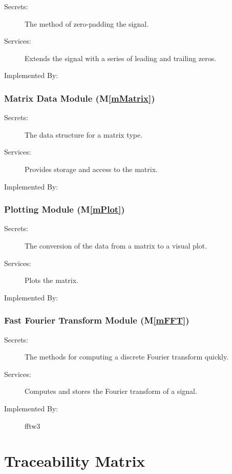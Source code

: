\documentclass[12pt, titlepage]{article}
\newcommand{\mref}[1]{M\ref{#1}}
\begin{document}
\begin{description}
\item[Secrets:]The method of zero-padding the signal.
\item[Services:]Extends the signal with a series of leading and trailing zeros.
\item[Implemented By:] \progname{}
\end{description}

\subsubsection{Matrix Data Module (\mref{mMatrix})}

\begin{description}
\item[Secrets:]The data structure for a matrix type.
\item[Services:]Provides storage and access to the matrix.
\item[Implemented By:] \progname{}
\end{description}

\subsubsection{Plotting Module (\mref{mPlot})}

\begin{description}
\item[Secrets:]The conversion of the data from a matrix to a visual plot.
\item[Services:]Plots the matrix.
\item[Implemented By:] \progname{}
\end{description}

\subsubsection{Fast Fourier Transform Module (\mref{mFFT})}

\begin{description}
\item[Secrets:]The methods for computing a discrete Fourier transform quickly.
\item[Services:]Computes and stores the Fourier transform of a signal.
\item[Implemented By:] fftw3
\end{description}


\section{Traceability Matrix} \label{SecTM}
\end{document}
